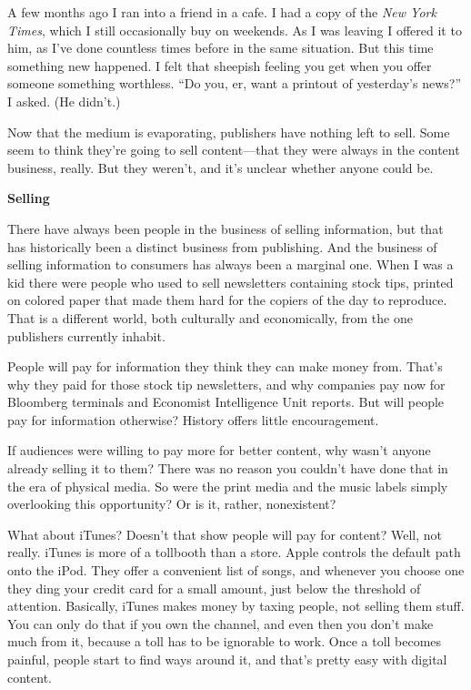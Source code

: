 \documentclass[12pt]{book}
\begin{document}
A few months ago I ran into a friend in a cafe. I had a copy of the
\emph{New York Times}, which I still occasionally buy on weekends. As I
was leaving I offered it to him, as I've done countless times before in
the same situation. But this time something new happened. I felt that
sheepish feeling you get when you offer someone something worthless.
``Do you, er, want a printout of yesterday's news?'' I asked. (He
didn't.)

Now that the medium is evaporating, publishers have nothing left to
sell. Some seem to think they're going to sell content---that they were
always in the content business, really. But they weren't, and it's
unclear whether anyone could be.

\textbf{Selling}

There have always been people in the business of selling information,
but that has historically been a distinct business from publishing. And
the business of selling information to consumers has always been a
marginal one. When I was a kid there were people who used to sell
newsletters containing stock tips, printed on colored paper that made
them hard for the copiers of the day to reproduce. That is a different
world, both culturally and economically, from the one publishers
currently inhabit.

People will pay for information they think they can make money from.
That's why they paid for those stock tip newsletters, and why companies
pay now for Bloomberg terminals and Economist Intelligence Unit reports.
But will people pay for information otherwise? History offers little
encouragement.

If audiences were willing to pay more for better content, why wasn't
anyone already selling it to them? There was no reason you couldn't have
done that in the era of physical media. So were the print media and the
music labels simply overlooking this opportunity? Or is it, rather,
nonexistent?

What about iTunes? Doesn't that show people will pay for content? Well,
not really. iTunes is more of a tollbooth than a store. Apple controls
the default path onto the iPod. They offer a convenient list of songs,
and whenever you choose one they ding your credit card for a small
amount, just below the threshold of attention. Basically, iTunes makes
money by taxing people, not selling them stuff. You can only do that if
you own the channel, and even then you don't make much from it, because
a toll has to be ignorable to work. Once a toll becomes painful, people
start to find ways around it, and that's pretty easy with digital
content.
\end{document}
